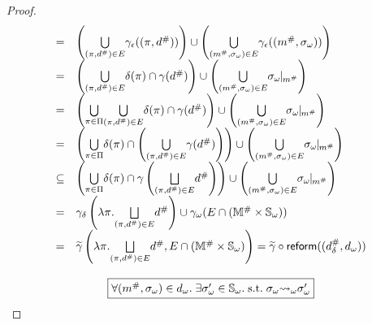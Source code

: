 \begin{proof}
\[\begin{array}{cl}
      =& \left( \underset{(\view, \abselem) \in E}{\bigcup} \aelemgamma((\view,
      \abselem)) \right) \cup \left( \underset{(\absimap, \symbst) \in
      E}{\bigcup} \aelemgamma((\absimap, \symbst)) \right)\\

      =& \left( \underset{(\view, \abselem) \in E}{\bigcup} \viewmap(\view) \cap
      \gamma(\abselem) \right) \cup \left( \underset{(\absimap, \symbst) \in
      E}{\bigcup} \instant{\symbst}{\absimap} \right)\\

      =& \left( \underset{\view \in \viewset}{\bigcup} { \underset{(\view,
      \abselem) \in E}{\bigcup} \viewmap(\view) \cap \gamma(\abselem) } \right)
      \cup \left( \underset{(\absimap, \symbst) \in E}{\bigcup}
      \instant{\symbst}{\absimap} \right)\\

      =& \left( \underset{\view \in \viewset}{\bigcup} {\viewmap(\view) \cap
        \left(\underset{(\view, \abselem) \in
      E}{\bigcup}{\gamma(\abselem)}\right)} \right) \cup \left(
      \underset{(\absimap, \symbst) \in E}{\bigcup} \instant{\symbst}{\absimap}
      \right)\\

      \subseteq& \left( \underset{\view \in \viewset}{\bigcup} {\viewmap(\view)
        \cap \gamma\left( \underset{(\view, \abselem) \in E}{\bigjoin}\abselem
      \right)} \right) \cup \left( \underset{(\absimap, \symbst) \in E}{\bigcup}
      \instant{\symbst}{\absimap} \right)\\

      =& \sgamma\left( \lambda \view. \underset{(\view, \abselem) \in
      E}{\bigjoin}\abselem \right) \cup \symbgamma(E \cap (\absimapset \times
      \symbstset))\\

      =& \combgamma\left( \lambda \view. \underset{(\view, \abselem) \in
      E}{\bigjoin}\abselem, E \cap (\absimapset \times \symbstset) \right)

      = \combgamma \circ \reform((\sabselem, \symbelem))
    \end{array}
  \]
  \[\]
  \[
    \fbox{$\forall ({m}^{\#}, {\sigma}_\omega) \in {{d}_\omega}. \; \exists {\sigma}_\omega' \in
    {\mathbb{S}}_\omega.  \; \text{s.t.} \; {\sigma}_\omega {\leadsto}_\omega {\sigma}_\omega'$}
  \]


\end{proof}
